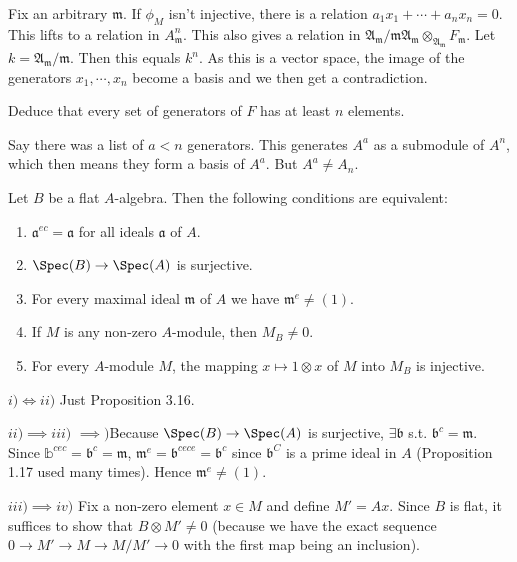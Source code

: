 \documentclass[a4paper]{exam}
\begin{document}
\begin{questions}
\begin{solution}
	Fix an arbitrary $\mathfrak{m} $.
	If $\phi _M $ isn't injective, there is a relation $a_1x_1 + \cdots + a_nx_n =0 $.
	This lifts to a relation in $A^n_{\mathfrak{m}} $.
	This also gives a relation in $\mathfrak{A}_{\mathfrak{m}} / \mathfrak{m}\mathfrak{A}_{\mathfrak{m}} \otimes_{\mathfrak{A}_{\mathfrak{m}}} F_{\mathfrak{m}}$.
	Let $k = \mathfrak{A}_{\mathfrak{m}} / \mathfrak{m}$.
	Then this equals $k^n $.
	As this is a vector space, the image of the generators $x_1,\cdots,x_n $ become a basis and we then get a contradiction.
\end{solution}
Deduce that every set of generators of $F$ has at least $n$ elements. 
\begin{solution}
	Say there was a list of $a<n $ generators.
	This generates $A^a $ as a submodule of $A^n $, which then means they form a basis of $A^a$.
	But $A^a \ne A_n $.
\end{solution}

\question Let $B $ be a flat $A $-algebra. Then the following conditions are equivalent:
\begin{enumerate}
	\item $\mathfrak{a}^{ec} = \mathfrak{a}  $ for all ideals $\mathfrak{a} $ of $A $.
	\item $\Spec(B) \to \Spec(A) $ is surjective.
	\item For every maximal ideal $\mathfrak{m} $ of $A $ we have $\mathfrak{m}^e \ne (1) $.
	\item If $M $ is any non-zero $A $-module, then $M_{B} \ne 0 $.
	\item For every $A $-module $M $, the mapping $x\mapsto 1 \otimes x $ of $M $ into $M_{B} $ is injective.
\end{enumerate}
\begin{solution}
	$i) \iff ii) $ Just Proposition 3.16.

	$ii) \implies iii) $ $\implies) $Because $\Spec(B)\to \Spec(A) $ is surjective, $\exists \mathfrak{b} $ s.t. $\mathfrak{b}^c = \mathfrak{m} $.
	Since $\mathbb{b}^{cec} = \mathfrak{b}^c = \mathfrak{m}  $, $\mathfrak{m}^e = \mathfrak{b}^{cece} = \mathfrak{b}^c  $ since $\mathfrak{b}^C $ is a prime ideal in $A $ (Proposition 1.17 used many times).
	Hence $\mathfrak{m}^e \ne (1) $.

	$iii) \implies iv) $
	Fix a non-zero element $x \in M $ and define $M' = Ax $.
	Since $B $ is flat, it suffices to show that $B \otimes M' \ne 0 $ (because we have the exact sequence $0 \to M' \to M \to M / M' \to 0 $ with the first map being an inclusion).


\end{solution}
\end{questions}
\end{document}
